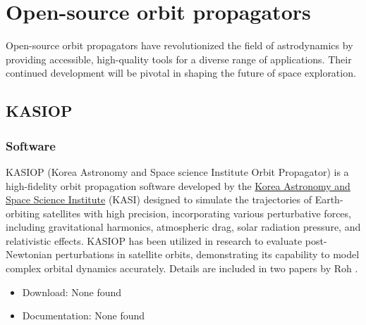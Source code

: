 \section{Open-source orbit propagators}
Open-source orbit propagators have revolutionized the field of astrodynamics by providing accessible, high-quality tools for a diverse range of applications. Their continued development will be pivotal in shaping the future of space exploration.


\subsection{KASIOP}
\subsubsection{Software}
KASIOP (Korea Astronomy and Space science Institute Orbit Propagator) is a high-fidelity orbit propagation software developed by the \href{https://www.kasi.re.kr/eng/index}{Korea Astronomy and Space Science Institute} (KASI) designed to simulate the trajectories of Earth-orbiting satellites with high precision, incorporating various perturbative forces, including gravitational harmonics, atmospheric drag, solar radiation pressure, and relativistic effects. KASIOP has been utilized in research to evaluate post-Newtonian perturbations in satellite orbits, demonstrating its capability to model complex orbital dynamics accurately. Details are included in two papers by Roh \cite{ROH20162255,roh2018numerical}.
\begin{itemize}
	\item Download: None found
	\item Documentation: None found
\end{itemize}

